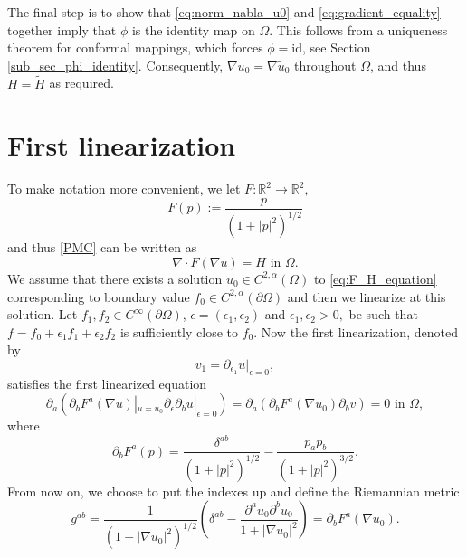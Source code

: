 \documentclass[a4paper, 10pt, twoside, notitlepage]{amsart}
\theoremstyle{plain}
\newcommand{\Om}{\Omega}
\numberwithin{equation}{section}
\newcommand {\R} {\mathbb{R}} \newcommand {\Z} {\mathbb{Z}}
\newcommand {\p} {\partial}
\newcommand{\e}{\epsilon}
\newcommand{\abs}[1]{\lvert #1 \rvert}
\begin{document}
The final step is to show that \eqref{eq:norm_nabla_u0} and \eqref{eq:gradient_equality} together imply that $\phi$ is the identity map on $\Omega$. This follows from a uniqueness theorem for conformal mappings, which forces $\phi = \text{id}$, see Section \ref{sub_sec_phi_identity}. Consequently, $\nabla u_0 = \nabla \tilde{u}_0$ throughout $\Omega$, and thus $H = \tilde{H}$ as required.



\section{First linearization}\label{sec_first_lin}

To make notation more convenient, we let $F\colon \R^2\to\R^2,$
\begin{equation*}
	F(p):=\frac{p}{(1+\abs{p}^2)^{1/2}}
\end{equation*}
and thus \eqref{PMC} can be written as
\begin{equation}\label{eq:F_H_equation}
	\nabla\cdot F(\nabla u) = H \text{ in } \Om.
\end{equation}
We assume that there exists a solution $u_0\in C^{2,\alpha}(\Omega)$ to \eqref{eq:F_H_equation} corresponding to boundary value $f_0\in C^{2,\alpha}(\p\Omega)$ and then we linearize at this solution. Let $f_1,f_2\in C^{\infty}(\p\Om)$, $\e=(\e_1,\e_2)$ and $\e_1, \e_2>0,$ be such that $f=f_0 + \e_1f_1 + \e_2f_2$ is sufficiently close to $f_0$. Now the first linearization, denoted by 
\[
v_1=\p_{\e_1}u|_{\e=0},
\]
satisfies the first linearized equation
\begin{equation}\label{first_lin}
	\p_a(\p_bF^a(\nabla u)|_{u=u_0}\p_{\e}\p_bu|_{\e=0}) = \p_a(\p_bF^a(\nabla u_0)\p_b v) = 0 \text{ in }\Om,
\end{equation}
where
\begin{equation}\label{first_deriv_F}
	\p_bF^a(p) = \frac{\delta^{ab}}{(1+\abs{p}^2)^{1/2}} - \frac{p_ap_b}{(1+\abs{p}^2)^{3/2}}.
\end{equation}
From now on, we choose to put the indexes up and define the Riemannian metric
\begin{equation}\label{def_g_0}
	g^{ab}=\frac{1}{(1+\abs{\nabla u_0}^2)^{1/2}}\left(\delta^{ab} - \frac{\p^au_0\p^bu_0}{1+\abs{\nabla u_0}^2}\right)=\p_bF^a(\nabla u_0).
\end{equation}
\end{document}
